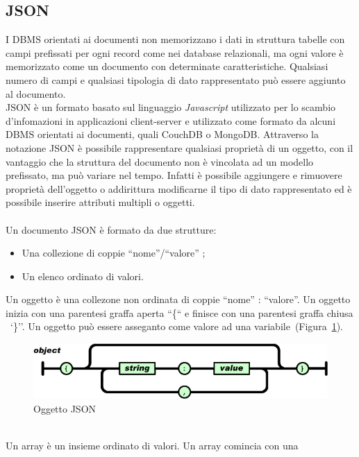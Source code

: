 \newpage
\subsection{JSON}
I \ac{DBMS} orientati ai documenti non memorizzano i dati in struttura tabelle
con campi prefissati per ogni record come nei database relazionali, ma ogni valore è
memorizzato come un documento con determinate caratteristiche. Qualsiasi numero
di campi e qualsiasi tipologia di dato rappresentato può essere aggiunto al
documento.
\\\acf{JSON} è un formato basato sul linguaggio
\emph{Javascript} utilizzato per lo scambio d'infomazioni in applicazioni
client-server e utilizzato come formato da alcuni DBMS orientati ai documenti,
quali \ac{CouchDB} o MongoDB.
Attraverso la notazione \ac{JSON} è possibile rappresentare qualsiasi proprietà
di un oggetto, con il vantaggio che la struttura del documento non è vincolata ad un
modello prefissato, ma può variare nel tempo. Infatti è possibile aggiungere e
rimuovere proprietà dell'oggetto o addirittura modificarne il tipo di dato
rappresentato ed è possibile inserire attributi multipli o oggetti.
\\\\Un documento \acl{JSON} è formato da due strutture:
\begin{itemize}
  \item Una collezione di coppie ``nome''/``valore'' ;
  \item Un elenco ordinato di valori. 
\end{itemize}
Un oggetto è una collezone non ordinata di coppie ``nome'' : ``valore''. Un
oggetto inizia con una parentesi graffa aperta ``\{`` e finisce con una parentesi
graffa chiusa ~`\}''. Un oggetto può essere asseganto
come valore ad una variabile~(Figura~\ref{fig:jsondoc}).
 \begin{figure}[!h]
  \begin{center}
      \includegraphics[scale=0.50]{icons/jsondoc.png}
      \caption{Oggetto JSON}
      \label{fig:jsondoc}
  \end{center}
\end{figure}
\\Un array è un insieme ordinato di valori. Un array comincia con una
